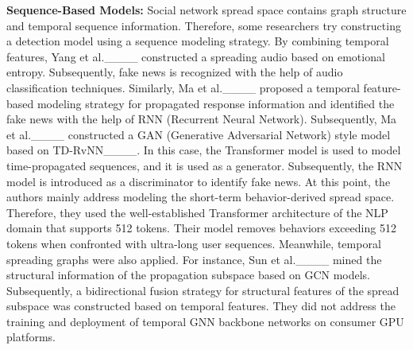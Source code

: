 \par \textbf{Sequence-Based Models:} Social network spread space contains graph structure and temporal sequence information. Therefore, some researchers try constructing a detection model using a sequence modeling strategy. By combining temporal features, Yang et al.____ constructed a spreading audio based on emotional entropy. Subsequently, fake news is recognized with the help of audio classification techniques. Similarly, Ma et al.____ proposed a temporal feature-based modeling strategy for propagated response information and identified the fake news with the help of RNN (Recurrent Neural Network). Subsequently, Ma et al.____ constructed a GAN (Generative Adversarial Network) style model based on TD-RvNN____. In this case, the Transformer model is used to model time-propagated sequences, and it is used as a generator. Subsequently, the RNN model is introduced as a discriminator to identify fake news. At this point, the authors mainly address modeling the short-term behavior-derived spread space. Therefore, they used the well-established Transformer architecture of the NLP domain that supports 512 tokens. Their model removes behaviors exceeding 512 tokens when confronted with ultra-long user sequences. Meanwhile, temporal spreading graphs were also applied. For instance, Sun et al.____ mined the structural information of the propagation subspace based on GCN models. Subsequently, a bidirectional fusion strategy for structural features of the spread subspace was constructed based on temporal features. They did not address the training and deployment of temporal GNN backbone networks on consumer GPU platforms.
